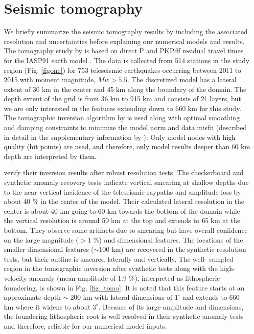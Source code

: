 \documentclass[draft,linenumbers]{agujournal2018}
\begin{document}
\section{Seismic tomography }
We briefly summarize the seismic tomography results by \citet{Biryol_2016} including the associated resolution and uncertainties before explaining our numerical models and results. The tomography study by \citet{Biryol_2016} is based on direct P and PKPdf residual travel times for the IASP91 earth model \citep{kennett1991traveltimes}. The data is collected from 514 stations in the study region (Fig. \ref{figone}) for 753 teleseismic earthquakes occurring between 2011 to 2015 with moment magnitude, $Mw > 5.5$. The discretized model has a lateral extent of 30 km in the center and 45 km along the boundary of the domain. The depth extent of the grid is from 36 km to 915 km and consists of 21 layers, but we are only interested in the features extending down to 660 km for this study. The tomographic inversion algorithm by \citet{schmandt2010seismic} is used along with optimal smoothing and damping constraints to minimize the model norm and data misfit (described in detail in the supplementary information by \citet{Biryol_2016}). Only model nodes with high quality (hit points) are used, and therefore, only model results deeper than 60 km depth are interpreted by them.
    
    \citet{Biryol_2016} verify their inversion results after robust resolution tests. The checkerboard and synthetic anomaly recovery tests indicate vertical smearing at shallow depths due to the near vertical incidence of the teleseismic raypaths and amplitude loss by about 40 \% in the center of the model. Their calculated lateral resolution in the center is about 40 km going to 60 km towards the bottom of the domain while the vertical resolution  is around 50 km at the top and extends to 65 km at the bottom. They observe some artifacts due to smearing but have overall confidence on the large magnitude ($>$1 \%) and dimensional features. The locations of the smaller dimensional features ($\sim$100 km) are recovered in the synthetic resolution tests, but their outline is smeared laterally and vertically. The well- sampled region in the tomographic inversion after synthetic tests along with the high-velocity anomaly (mean amplitude of 1.9 \%), interpreted as lithospheric foundering, is shown in Fig. \ref{fig_tomo}. It is noted that this feature starts at an approximate depth $\sim$ 200 km with lateral dimensions of $1^\circ$ and extends to 660 km where it widens to about $3^\circ$. Because of its large amplitude and dimensions, the foundering lithospheric root is well resolved in their synthetic anomaly tests and therefore, reliable for our numerical model inputs. 
\end{document}
